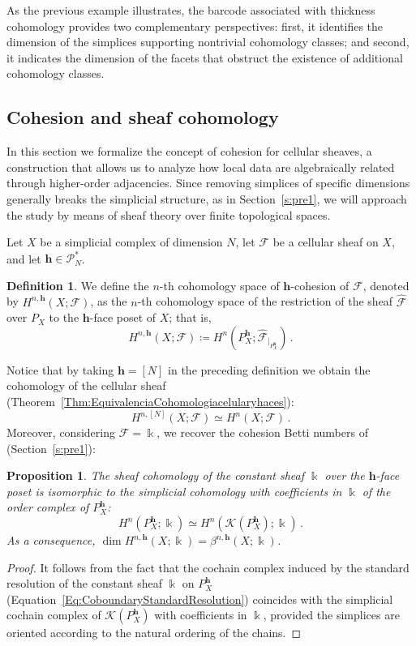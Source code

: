 \documentclass[reqno,12pt]{amsart}
\newcommand{\cF}{{\mathcal F}}
\newcommand{\cP}{\mathcal{P}}
\newcommand{\0}{\mathbf 0}
\newcommand{\h}{\mathbf{h}}
\newtheorem{proposition}[theorem]{Proposition}
\theoremstyle{definition}
\newtheorem{definition}[theorem]{Definition}
\begin{document}
As the previous example illustrates, the barcode associated with thickness cohomology provides two complementary perspectives: first, it identifies the dimension of the simplices supporting nontrivial cohomology classes; and second, it indicates the dimension of the facets that obstruct the existence of additional cohomology classes.

\subsection{Cohesion and sheaf cohomology}\label{Subsec:CohesionHaces}\quad 

In this section we formalize the concept of cohesion for cellular sheaves, a construction that allows us to analyze how local data are algebraically related through higher-order adjacencies. Since removing simplices of specific dimensions generally breaks the simplicial structure, as in Section~\ref{s:pre1}, we will approach the study by means of sheaf theory over finite topological spaces.

Let $X$ be a simplicial complex of dimension $N$, let $\cF$ be a cellular sheaf on $X$, and let $\h\in \cP^*_N$.
\begin{definition}
We define the $n$-th cohomology space of $\h$-cohesion of $\cF$, denoted by $H^{n,\h}(X;\cF)$, as the $n$-th cohomology space of the restriction of the sheaf $\widehat{\cF}$ over $P_{X}$ to the $\h$-face poset of $X$; that is,
    \[
    H^{n,\h}(X;\cF)\coloneqq H^n(P_X^\h;\widehat{\cF}_{|_{P_X^{\h}}})\, .
    \]
\end{definition}
Notice that by taking $\h=[N]$ in the preceding definition we obtain the cohomology of the cellular sheaf (Theorem~\ref{Thm:EquivalenciaCohomologiacelularyhaces}):
\[
H^{n,[N]}(X;\cF)\simeq H^n(X;\cF)\, .
\]
Moreover, considering $\cF=\Bbbk$, we recover the cohesion Betti numbers of \cite{Pablo_Dani_Dario_25} (Section~\ref{s:pre1}):
\begin{proposition}
    The sheaf cohomology of the constant sheaf $\Bbbk$ over the $\h$-face poset is isomorphic to the simplicial cohomology with coefficients in $\Bbbk$ of the order complex of $P_X^{\h}$:
    \[
    H^n(P_X^\h;\Bbbk) \simeq H^n(\mathcal{K}(P_X^\h);\Bbbk)\,.
    \]
    As a consequence, $\dim H^{n,\h}(X;\Bbbk) = \beta^{n,\h}(X;\Bbbk)$.
\end{proposition}
\begin{proof}
It follows from the fact that the cochain complex induced by the standard resolution of the constant sheaf $\Bbbk$ on $P_X^{\h}$ (Equation~\eqref{Eq:CoboundaryStandardResolution}) coincides with the simplicial cochain complex of $\mathcal{K}(P_X^\h)$ with coefficients in $\Bbbk$, provided the simplices are oriented according to the natural ordering of the chains.
\end{proof}
\end{document}
